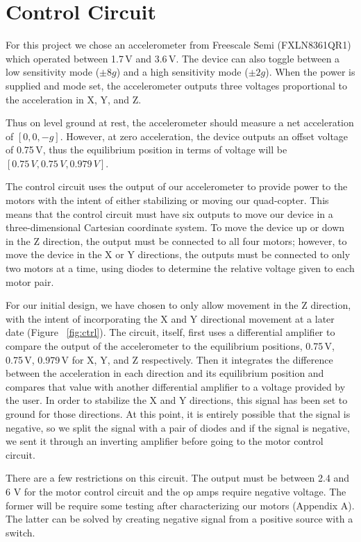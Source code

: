 \section{Control Circuit}

For this project we chose an accelerometer from Freescale Semi (FXLN8361QR1) which operated between 1.7\,V and 3.6\,V. The device can also toggle between a low sensitivity mode ($\pm8g$) and a high sensitivity mode ($\pm2g$). When the power is supplied and mode set, the accelerometer outputs three voltages proportional to the acceleration in X, Y, and Z.

Thus on level ground at rest, the accelerometer should measure a net acceleration of $[0,0,-g]$. However, at zero acceleration, the device outputs an offset voltage of 0.75\,V, thus the equilibrium position in terms of voltage will be $[0.75\,V,0.75\,V,0.979\,V]$.

The control circuit uses the output of our accelerometer to provide power to the motors with the intent of either stabilizing or moving our quad-copter. This means that the control circuit must have six outputs to move our device in a three-dimensional Cartesian coordinate system. To move the device up or down in the Z direction, the output must be connected to all four motors; however, to move the device in the X or Y directions, the outputs must be connected to only two motors at a time, using diodes to determine the relative voltage given to each motor pair. 

For our initial design, we have chosen to only allow movement in the Z direction, with the intent of incorporating the X and Y directional movement at a later date (Figure ~\ref{fig:ctrl}). The circuit, itself, first uses a differential amplifier to compare the output of the accelerometer to the equilibrium positions, 0.75\,V, 0.75\,V, 0.979\,V for X, Y, and Z respectively. Then it integrates the difference between the acceleration in each direction and its equilibrium position and compares that value with another differential amplifier to a voltage provided by the user. In order to stabilize the X and Y directions, this signal has been set to ground for those directions. At this point, it is entirely possible that the signal is negative, so we split the signal with a pair of diodes and if the signal is negative, we sent it through an inverting amplifier before going to the motor control circuit.

There are a few restrictions on this circuit. The output must be between 2.4 and 6 V for the motor control circuit and the op amps require negative voltage. The former will be require some testing after characterizing our motors (Appendix A). The latter can be solved by creating negative signal from a positive source with a switch.

